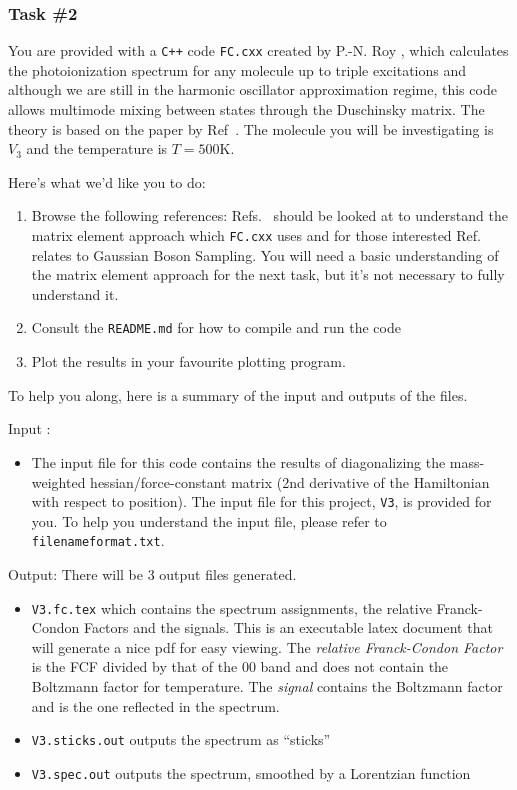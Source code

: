 \documentclass[12pt]{article}
\begin{document}
\subsubsection*{Task \#2}

You are provided with a \texttt{C++} code \texttt{FC.cxx} created by P.-N. Roy \cite{yang1995structure}, which calculates the photoionization spectrum for any molecule up to triple excitations and although we are still in the harmonic oscillator approximation regime, this code allows multimode mixing between states through the Duschinsky matrix. The theory is based on the paper by Ref~\cite{doktorov1977dynamical}. The molecule you will be investigating is $V_3$ and the temperature is $T=500$K.

Here's what we'd like you to do:
\begin{enumerate}
    \item Browse the following references: Refs.~\cite{yang1995structure,jankowiak2007vibronic} should be looked at to understand the matrix element approach which \texttt{FC.cxx} uses and for those interested Ref.~\cite{quesadaFranckCondonFactorsCounting2019} relates to Gaussian Boson Sampling. You will need a basic understanding of the matrix element approach for the next task, but it's not necessary to fully understand it.
    \item Consult the \texttt{README.md} for how to compile and run the code
     \item Plot the results in your favourite plotting program. 
\end{enumerate}
To help you along, here is a summary of the input and outputs of the files.

\noindent Input :
\begin{itemize}
\item  The input file for this code contains the results of diagonalizing the mass-weighted hessian/force-constant matrix (2nd derivative of the Hamiltonian with respect to position). The input file for this project, \texttt{V3}, is provided for you. To help you understand the input file, please refer to \texttt{filenameformat.txt}. 
\end{itemize}

\noindent Output: There will be 3 output files generated. 
\begin{itemize}
\item  \texttt{V3.fc.tex} which contains the spectrum assignments, the relative Franck-Condon Factors and the signals. This is an executable latex document that will generate a nice pdf for easy viewing. The  {\it relative Franck-Condon Factor} is the FCF divided by that of the 00 band and does not contain the Boltzmann factor for temperature. The {\it signal} contains the Boltzmann factor and is the one reflected in the spectrum. 
\item \texttt{V3.sticks.out} outputs the spectrum as ``sticks''
\item \texttt{V3.spec.out} outputs the spectrum, smoothed by a Lorentzian function  
\end{itemize}
\end{document}
